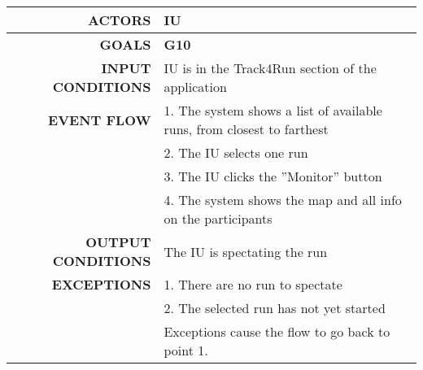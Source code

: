 \begin{table}[h!]
\begin{tabular}{|r|p{3in}|}
\hline
\textbf{ACTORS} & IU\\
\hline
\textbf{GOALS} &	\textbf{G10} \\
\hline
\textbf{INPUT CONDITIONS} & IU is in the Track4Run section of the application \\
\hline
\textbf{EVENT FLOW} 
&1. The system shows a list of available runs, from closest to farthest \\
&2. The IU selects one run \\
&3. The IU clicks the ''Monitor'' button\\
&4. The system shows the map and all info on the participants\\
\hline
\textbf{OUTPUT CONDITIONS} & The IU is spectating the run\\
\hline
\textbf{EXCEPTIONS} 
&1. There are no run to spectate\\
&2. The selected run has not yet started\\
&Exceptions cause the flow to go back to point 1.\\
\hline
\end{tabular}
\end{table}
